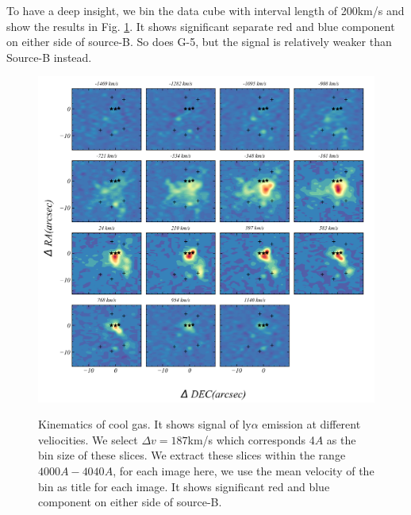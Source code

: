 \documentclass[../Results.tex]{subfiles}
\begin{document}
	 To have a deep insight, we bin the data cube with interval length of 200km/s and show the results in Fig. \ref{slices}. It shows significant separate red and blue component on either side of source-B. So does G-5, but the signal is relatively weaker than Source-B instead.
	\begin{figure}[htp]
		\centering
		\includegraphics[width=\textwidth]{figs/slices}
		\label{slices}
		\caption{Kinematics of cool gas. It shows signal of ly$\alpha$ emission at different veliocities. We select $\Delta v=187$km/s which corresponds 4$A$  as the bin size of these slices. We extract these slices within the range $4000A-4040A$, for each image here, we use the mean velocity of the bin as title for each image. It shows significant red and blue component on either side of source-B.}
	\end{figure}
	
\end{document}

